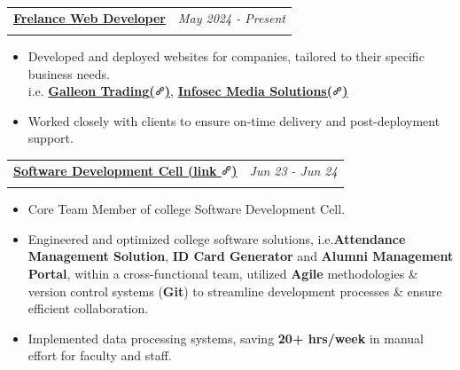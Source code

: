 \documentclass[a4paper,11pt]{article}
\makeatletter
\newcommand{\resumeSubheading}[4]{
\vspace{-1.8mm}\item
    \begin{tabular*}{0.98\textwidth}[t]{l@{\extracolsep{\fill}}r}
    	\vspace{-0.6mm}
        \textbf{#1} & \textit{\footnotesize{#4}} \\
        
        \textit{\footnotesize{#3}} &  \footnotesize{#2}\\
    \end{tabular*}
    \vspace{-0.9mm}
}
\newcommand{\resumeItemListStart}{\begin{justify}\begin{itemize}[leftmargin=3ex, rightmargin=2ex, noitemsep,labelsep=1.2mm,itemsep=0mm]\small}
\newcommand{\resumeItemListEnd}{\end{itemize}\end{justify}\vspace{-2mm}}
\newcommand{\customtext}[1]{{\sffamily\bfseries #1}}
\makeatother
\begin{document}
  \resumeSubheading
  {\href{}{ Frelance Web Developer}}{}{}{May 2024 - Present}
  \vspace{-6.8mm}
  \resumeItemListStart
  \item { Developed and deployed websites for companies, tailored to their specific business needs.\\ {i.e. \href{https://galleontrading.netlify.app/}{\customtext{\textbf{\textcolor{sand}{Galleon Trading{\color{gray}\textbf{(\includegraphics[width=0.3cm,clip]{url.png})}}}}}}, \href{https://infosecmediasolutions.com/}{\customtext{\textbf{\textcolor{sand}{Infosec Media Solutions{\color{gray}\textbf{(\includegraphics[width=0.3cm,clip]{url.png})}} }}}} }}
  \item { Worked closely with clients to ensure on-time delivery and post-deployment support. }
  \resumeItemListEnd
  \vspace{-1.2mm}
  
  \resumeSubheading
  { \href{https://drive.google.com/file/d/1ZNoRp0EB6hrygvFPSQCxQaDED3AuGTaY/view?usp=sharing}{Software Development Cell {\color{gray}\textbf{(link \includegraphics[width=0.3cm,clip]{url.png})}}}}{}
  {}{Jun 23 - Jun 24}
  \vspace{-6.8mm}
  \resumeItemListStart
  \item { Core Team Member of college Software Development Cell.} 
  \item { Engineered and optimized college software solutions, i.e.\customtext{\textbf{\textcolor{sand}{Attendance Management Solution}}}, \customtext{\textbf{\textcolor{sand}{ID Card Generator}}} and \customtext{\textbf{\textcolor{sand}{Alumni Management Portal}}}, within a cross-functional team, utilized \customtext{\textbf{\textcolor{sand}{Agile}}} methodologies \& version control systems (\customtext{\textbf{\textcolor{sand}{Git}}}) to streamline development processes \& ensure efficient collaboration.}
  \item {Implemented data processing systems, saving \customtext{\textbf{\textcolor{sand}{20+ hrs/week}}} in manual effort for faculty and staff.}
  \resumeItemListEnd
  
  \vspace{-1.6mm}
  \vspace{0.7mm}
  
\end{document}
